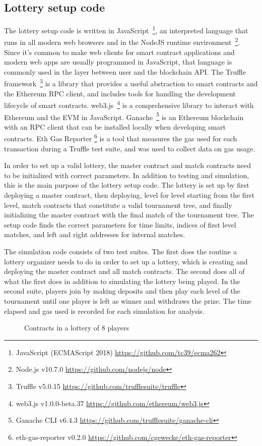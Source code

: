 


\subsection{Lottery setup code}
The lottery setup code is written in JavaScript~\footnote{JavaScript (ECMAScript 2018) \url{https://github.com/tc39/ecma262}}, an interpreted language that runs in all modern web browsers and in the NodeJS runtime environment~\footnote{Node.js v10.7.0 \url{https://github.com/nodejs/node}}. Since it's common to make web clients for smart contract applications and modern web apps are usually programmed in JavaScript, that language is commonly used in the layer between user and the blockchain API. The Truffle framework~\footnote{Truffle v5.0.15 \url{https://github.com/trufflesuite/truffle}} is a library that provides a useful abstraction to smart contracts and the Ethereum RPC client, and includes tools for handling the development lifecycle of smart contracts. web3.js~\footnote{web3.js v1.0.0-beta.37 \url{https://github.com/ethereum/web3.js}} is a comprehensive library to interact with Ethereum and the EVM in JavaScript. Ganache~\footnote{Ganache CLI v6.4.3 \url{https://github.com/trufflesuite/ganache-cli}} is an Ethereum blockchain with an RPC client that can be installed locally when developing smart contracts. Eth Gas Reporter \footnote{eth-gas-reporter v0.2.0 \url{https://github.com/cgewecke/eth-gas-reporter}} is a tool that measures the gas used for each transaction during a Truffle test suite, and was used to collect data on gas usage.

In order to set up a valid lottery, the master contract and match contracts need to be initialized with correct parameters. In addition to testing and simulation, this is the main purpose of the lottery setup code. The lottery is set up by first deploying a master contract, then deploying, level for level starting from the first level, match contracts that constitute a valid tournament tree, and finally initializing the master contract with the final match of the tournament tree. The setup code finds the correct parameters for time limits, indices of first level matches, and left and right addresses for internal matches. 

The simulation code consists of two test suites. The first does the routine a lottery organizer needs to do in order to set up a lottery, which is creating and deploying the master contract and all match contracts. The second does all of what the first does in addition to simulating the lottery being played. In the second suite, players join by making deposits and then play each level of the tournament until one player is left as winner and withdraws the prize.
The time elapsed and gas used is recorded for each simulation for analysis.

\begin{figure}[htbp]
  \centering
  
  \caption{Contracts in a lottery of 8 players}
\end{figure}
